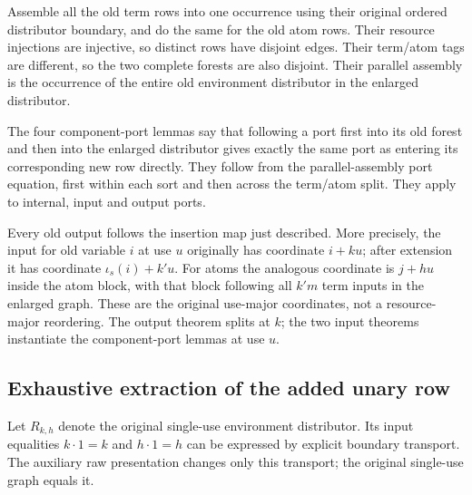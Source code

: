 Assemble all the old term rows into one occurrence using their original
ordered distributor boundary, and do the same for the old atom rows.
Their resource injections are injective, so distinct rows have disjoint
edges. Their term/atom tags are different, so the two complete forests are
also disjoint. Their parallel assembly is the occurrence of the entire
old environment distributor in the enlarged distributor.

The four component-port lemmas say that following a port first into its
old forest and then into the enlarged distributor gives exactly the same
port as entering its corresponding new row directly. They follow from the
parallel-assembly port equation, first within each sort and then across
the term/atom split. They apply to internal, input and output ports.

Every old output follows the insertion map just described. More precisely,
the input for old variable $i$ at use $u$ originally has coordinate $i+ku$;
after extension it has coordinate $\iota_s(i)+k'u$. For atoms the analogous
coordinate is $j+hu$ inside the atom block, with that block following all
$k'm$ term inputs in the enlarged graph. These are the original use-major
coordinates, not a resource-major reordering. The output theorem splits at
$k$; the two input theorems instantiate the component-port lemmas at use $u$.

\subsection{Exhaustive extraction of the added unary row}
Let $R_{k,h}$ denote the original single-use environment distributor. Its
input equalities $k\cdot1=k$ and $h\cdot1=h$ can be expressed by explicit
boundary transport. The auxiliary raw presentation changes only this
transport; the original single-use graph equals it.

